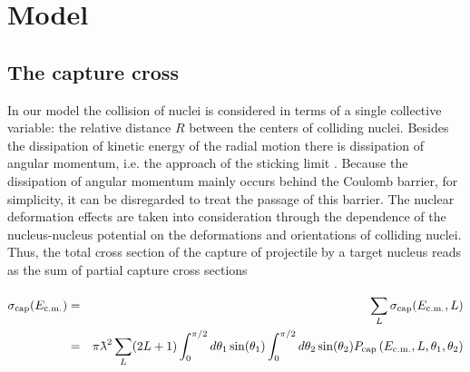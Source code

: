 \documentclass[preprint,review,12pt]{elsarticle}
\newcommand{\lambdabar}{{\mkern0.75mu\mathchar '26\mkern -9.75mu\lambda}}
\begin{document}
\newpage

\section{Model}
\subsection{The capture cross}
\label{1}
  In our model the collision of nuclei is considered in terms of a single collective variable: the relative
  distance $R$ between the centers of colliding nuclei.
  Besides the dissipation of kinetic energy of the radial motion there is dissipation of angular momentum, i.e. the approach of the sticking limit \cite{VVV,Schreder}.
  Because the dissipation of angular momentum mainly occurs behind the Coulomb barrier, for simplicity, it can be disregarded to treat the passage of this barrier.
  The nuclear deformation effects are taken into consideration through the dependence
  of the nucleus-nucleus potential on the deformations and
  orientations of colliding nuclei. Thus, the total cross section of the
  capture of projectile by a target nucleus reads as the sum of partial capture cross sections
 

  \begin{eqnarray}
  \sigma_{\rm cap}(E_{\rm c.m.})&=&\sum_{L}^{}\sigma_{\rm cap}(E_{\rm c.m.},L)\nonumber\\
  &=&\pi\lambdabar^2 \sum_{L}(2L+1)\int_0^{\pi/2}d\theta_1\sin(\theta_1)\int_0^{\pi/2}d\theta_2\sin(\theta_2)P_{\rm cap}\left(E_{\rm c.m.},L,\theta_1,\theta_2\right)
  \label{1a_eq}
  \end{eqnarray}
\end{document}
